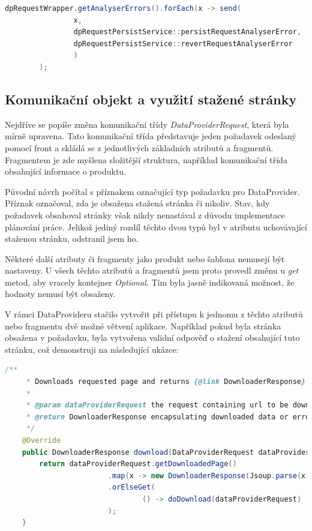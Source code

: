 \documentclass[thesis=B,czech]{FITthesis}[2012/06/26]
\begin{document}
\begin{lstlisting}[language=Java, caption={Příklad zavolání metody odesílající požadavky}]
        dpRequestWrapper.getAnalyserErrors().forEach(x -> send(
                x,
                dpRequestPersistService::persistRequestAnalyserError,
                dpRequestPersistService::revertRequestAnalyserError
                )
        );
\end{lstlisting}

\subsection{Komunikační objekt a využití stažené stránky}
Nejdříve se popíše změna komunikační třídy \textit{DataProviderRequest}, která byla mírně upravena.
Tato komunikační třída představuje jeden požadavek odeslaný pomocí front a skládá se z jednotlivých základních atributů a fragmentů.
Fragmentem je zde myšlena složitější struktura, například komunikační třída obsahující informace o produktu.
\par
Původní návrh počítal s příznakem označující typ požadavku pro DataProvider. Příznak označoval, zda je obsažena stažená stránka či nikoliv. Stav, kdy požadavek obsahoval stránky však nikdy nenastával z důvodu implementace plánování práce. Jelikož jediný rozdíl těchto dvou typů byl v atributu uchovávající staženou stránku, odstranil jsem ho.
\par
Některé další atributy či fragmenty jako produkt nebo šablona nemusejí být nastaveny. U všech těchto atributů a fragmentů jsem proto provedl změnu u \textit{get} metod, aby vracely kontejner \textit{Optional}. Tím byla jasně indikovaná možnost, že hodnoty nemusí být obsaženy.
\par
V rámci DataProvideru stačilo vytvořit při přístupu k jednomu z těchto atributů nebo fragmentu dvě možné větvení aplikace.
Například pokud byla stránka obsažena v požadavku, byla vytvořena validní odpověď o stažení obsahující tuto stránku, což demonstruji na 
následující ukázce:
\begin{lstlisting}[language=Java, caption={Veřejná metoda třídy \textit{DPDownloaderServiceImpl} zajišťující stažení stránky obsahující detail produktu}]
    /**
     * Downloads requested page and returns {@link DownloaderResponse} object.
     *
     * @param dataProviderRequest the request containing url to be downloaded
     * @return DownloaderResponse encapsulating downloaded data or error
     */
    @Override
    public DownloaderResponse download(DataProviderRequest dataProviderRequest) {
        return dataProviderRequest.getDownloadedPage()
                        .map(x -> new DownloaderResponse(Jsoup.parse(x)))
                        .orElseGet(
                                () -> doDownload(dataProviderRequest)
                        );
    }
\end{lstlisting}
\end{document}
